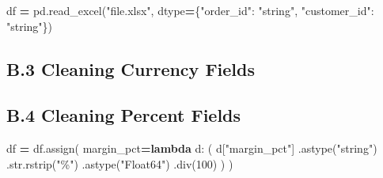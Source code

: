 \documentclass[
  12pt,
]{article}
\newenvironment{Shaded}{\begin{snugshade}}{\end{snugshade}}
\newcommand{\BuiltInTok}[1]{#1}
\newcommand{\DecValTok}[1]{\textcolor[rgb]{0.00,0.00,0.81}{#1}}
\newcommand{\KeywordTok}[1]{\textcolor[rgb]{0.13,0.29,0.53}{\textbf{#1}}}
\newcommand{\NormalTok}[1]{#1}
\newcommand{\OperatorTok}[1]{\textcolor[rgb]{0.81,0.36,0.00}{\textbf{#1}}}
\newcommand{\PreprocessorTok}[1]{\textcolor[rgb]{0.56,0.35,0.01}{\textit{#1}}}
\newcommand{\StringTok}[1]{\textcolor[rgb]{0.31,0.60,0.02}{#1}}
\newcommand{\VariableTok}[1]{\textcolor[rgb]{0.00,0.00,0.00}{#1}}
\newcommand{\VerbatimStringTok}[1]{\textcolor[rgb]{0.31,0.60,0.02}{#1}}
\begin{document}
\begin{Shaded}
\begin{Highlighting}[]
\NormalTok{df }\OperatorTok{=}\NormalTok{ pd.read\_excel(}\StringTok{"file.xlsx"}\NormalTok{, dtype}\OperatorTok{=}\NormalTok{\{}\StringTok{"order\_id"}\NormalTok{: }\StringTok{"string"}\NormalTok{, }\StringTok{"customer\_id"}\NormalTok{: }\StringTok{"string"}\NormalTok{\})}
\end{Highlighting}
\end{Shaded}

\subsection{B.3 Cleaning Currency
Fields}\label{b.3-cleaning-currency-fields}

\begin{Shaded}
\end{Shaded}

\subsection{B.4 Cleaning Percent
Fields}\label{b.4-cleaning-percent-fields}

\begin{Shaded}
\begin{Highlighting}[]
\NormalTok{df }\OperatorTok{=}\NormalTok{ df.assign(}
\NormalTok{    margin\_pct}\OperatorTok{=}\KeywordTok{lambda}\NormalTok{ d: (}
\NormalTok{        d[}\StringTok{"margin\_pct"}\NormalTok{]}
\NormalTok{        .astype(}\StringTok{"string"}\NormalTok{)}
\NormalTok{        .}\BuiltInTok{str}\NormalTok{.rstrip(}\StringTok{"\%"}\NormalTok{)}
\NormalTok{        .astype(}\StringTok{"Float64"}\NormalTok{)}
\NormalTok{        .div(}\DecValTok{100}\NormalTok{)}
\NormalTok{    )}
\NormalTok{)}
\end{Highlighting}
\end{Shaded}
\end{document}

